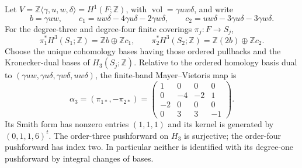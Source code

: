 \begin{proposition}
\label{mapsaudit:finite-degree-three}
Let $V=\mathbb Z\langle\gamma,u,w,\delta\rangle=H^1(F;\mathbb Z)$,
with $\operatorname{vol}=\gamma u w\delta$, and write
\[
 b=\gamma uw,\qquad
 c_1=uw\delta-4\gamma u\delta-2\gamma w\delta,\qquad
 c_2=uw\delta-3\gamma u\delta-3\gamma w\delta.
\]
For the degree-three and degree-four finite coverings $\pi_j:F\to S_j$,
\[
 \pi_1^*H^3(S_1;\mathbb Z)=\mathbb Zb\oplus\mathbb Zc_1,
 \qquad
 \pi_2^*H^3(S_2;\mathbb Z)=\mathbb Z(2b)\oplus\mathbb Zc_2.
\]
Choose the unique cohomology bases having those ordered pullbacks and the
Kronecker-dual bases of $H_3(S_j;\mathbb Z)$. Relative to the ordered
homology basis dual to $(\gamma uw,\gamma u\delta,\gamma w\delta,uw\delta)$,
the finite-band Mayer--Vietoris map is
\[
 \alpha_3=(\pi_{1*},-\pi_{2*})=
 \begin{pmatrix}
 1&0&0&0\\
 0&-4&-2&1\\
 -2&0&0&0\\
 0&3&3&-1
 \end{pmatrix}.
\]
Its Smith form has nonzero entries $(1,1,1)$ and its kernel is generated
by $(0,1,1,6)^t$. The order-three pushforward on $H_3$ is surjective;
the order-four pushforward has index two. In particular neither is
identified with its degree-one pushforward by integral changes of bases.
\end{proposition}
